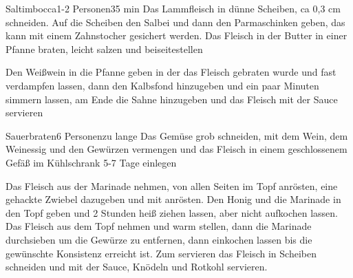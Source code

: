 
\begin{recipe}{Saltimbocca}{1-2 Personen}{35 min}
Das Lammfleisch in dünne Scheiben, ca 0,3 cm schneiden. Auf die Scheiben den Salbei und dann den Parmaschinken geben, das kann mit einem Zahnstocher gesichert werden. Das Fleisch in der Butter in einer Pfanne braten, leicht salzen und beiseitestellen

Den Weißwein in die Pfanne geben in der das Fleisch gebraten wurde und fast verdampfen lassen, dann den Kalbsfond hinzugeben und ein paar Minuten simmern lassen, am Ende die Sahne hinzugeben und das Fleisch mit der Sauce servieren
\end{recipe}


\begin{recipe}{Sauerbraten}{6 Personen}{zu lange}
Das Gemüse grob schneiden, mit dem Wein, dem Weinessig und den Gewürzen vermengen und das Fleisch in einem geschlossenem Gefäß im Kühlschrank 5-7 Tage einlegen

Das Fleisch aus der Marinade nehmen, von allen Seiten im Topf anrösten, eine gehackte Zwiebel dazugeben und mit anrösten. Den Honig und die Marinade in den Topf geben und 2 Stunden heiß ziehen lassen, aber nicht aufkochen lassen. Das Fleisch aus dem Topf nehmen und warm stellen, dann die Marinade durchsieben um die Gewürze zu entfernen, dann einkochen lassen bis die gewünschte Konsistenz erreicht ist.
Zum servieren das Fleisch in Scheiben schneiden und mit der Sauce, Knödeln und Rotkohl servieren.
\end{recipe}


